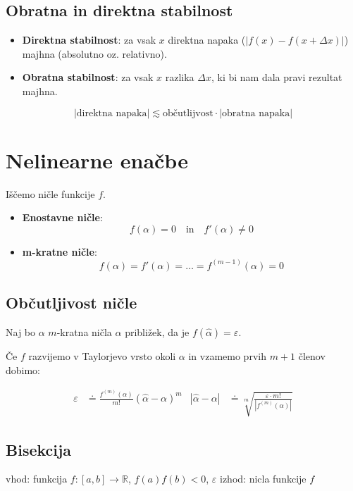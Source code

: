 \begin{multicols}{5}
\subsection{Obratna in direktna stabilnost}
\begin{itemize}
	\item \textbf{Direktna stabilnost}: za vsak $x$ direktna napaka ($|f(x) - f(x + \Delta x)|$) majhna (absolutno oz. relativno).
	\item \textbf{Obratna stabilnost}: za vsak $x$ razlika $\Delta x$, ki bi nam dala pravi rezultat majhna.
\end{itemize}

\[ |\text{direktna napaka}| \lesssim \text{občutlijvost} \cdot |\text{obratna napaka}|\]

\section{Nelinearne enačbe}
Iščemo ničle funkcije $f$.
\begin{itemize}
	\item \textbf{Enostavne ničle}: 
	\[f(\alpha) = 0 \quad \text{in} \quad f'(\alpha) \neq 0\]
	\item \textbf{m-kratne ničle}: 
	\[f(\alpha) = f'(\alpha) = \dots = f^{(m-1)}(\alpha) = 0\]
\end{itemize}

\subsection{Občutljivost ničle}
Naj bo $\alpha$  $m$-kratna ničla $\hat{\alpha}$ približek, da je $f(\hat{\alpha}) = \varepsilon$.

Če $f$ razvijemo v Taylorjevo vrsto okoli $\alpha$ in vzamemo prvih $m+1$ členov dobimo:

\begin{align*}
	\varepsilon &\doteq \frac{f^{(m)} (\alpha)}{ m! }(\hat{\alpha} - \alpha )^m &
	|\hat{\alpha} - \alpha| &\doteq \sqrt[m]{\frac{\varepsilon \cdot m!}{|f^{(m)} (\alpha)|}}
\end{align*}


\subsection{Bisekcija}

\begin{koda}[]
vhod: funkcija $f: [a,b] \to \mathbb{R}$, $f(a)f(b) < 0$,  $\varepsilon$
izhod: nicla funkcije $f$


\end{koda}
\end{multicols}
